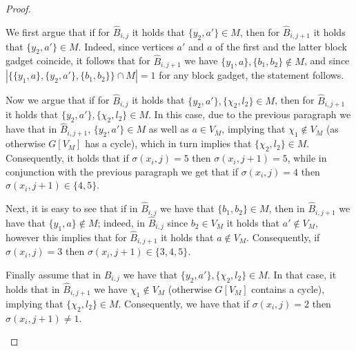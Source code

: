 \begin{proof}
\begin{nestedproof}
\begin{claimproof}
                We first argue that if for $\hat{B}_{i,j}$ it holds that
                $\{y_2 , a'\} \in M$,
                then for $\hat{B}_{i,j+1}$ it holds that
                $\{y_2 , a'\} \in M$.
                Indeed, since vertices $a'$ and $a$ of the first and the latter block gadget coincide,
                it follows that for $\hat{B}_{i,j+1}$ we have $\{y_1, a\}, \{b_1,b_2\} \notin M$,
                and since $|\{\{ y_1, a \}, \{ y_2, a' \}, \{ b_1, b_2 \}\} \cap M| = 1$ for any block gadget,
                the statement follows.

                Now we argue that if for $\hat{B}_{i,j}$ it holds that
                $\{y_2 , a'\}, \{\chi_2,l_2\} \in M$,
                then for $\hat{B}_{i,j+1}$ it holds that
                $\{y_2 , a'\}, \{\chi_2,l_2\} \in M$.
                In this case, due to the previous paragraph we have that in $\hat{B}_{i,j+1}$,
                $\{y_2 , a'\} \in M$ as well as $a \in V_M$,
                implying that $\chi_1 \notin V_M$ (as otherwise $G[V_M]$ has a cycle),
                which in turn implies that $\{\chi_2 , l_2\} \in M$.
                Consequently, it holds that if $\sigma (x_i,j) = 5$ then $\sigma (x_i,j+1) = 5$,
                while in conjunction with the previous paragraph we get that if $\sigma (x_i,j) = 4$
                then $\sigma (x_i,j+1) \in \{4,5\}$.

                Next, it is easy to see that if in $\hat{B}_{i,j}$ we have that $\{b_1 ,b_2 \} \in M$,
                then in $\hat{B}_{i,j+1}$ we have that $\{y_1 , a \} \notin M$;
                indeed, in $\hat{B}_{i,j}$ since $b_2 \in V_M$ it holds that $a' \notin V_M$,
                however this implies that for $\hat{B}_{i,j+1}$  it holds that $a \notin V_M$.
                Consequently, if $\sigma (x_i,j) = 3$ then $\sigma (x_i,j+1) \in \{3,4,5\}$.

                Finally assume that in $\hat{B}_{i,j}$
                we have that $\{y_2 ,a'\} , \{\chi_2 , l_2\} \in M$.
                In that case, it holds that in $\hat{B}_{i,j+1}$ we have $\chi_1 \notin V_M$
                (otherwise $G[V_M]$ contains a cycle),
                implying that $\{\chi_2, l_2\} \in M$.
                Consequently, we have that if $\sigma (x_i,j) = 2$ then
                $\sigma (x_i,j+1) \neq 1$.
            \end{claimproof}


\end{nestedproof}
\end{proof}
